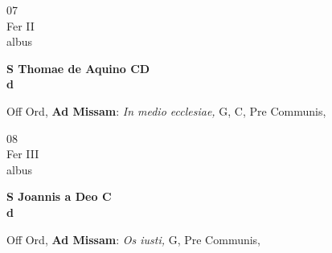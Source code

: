 \documentclass[10pt, openany]{book}
\begin{document}
        \begin{center}
            \begin{minipage}{3.5in}
                \vspace{2em}
                \begin{minipage}{0.5in}
                    {\Huge 07} \\
                    {\normalsize Fer II} \\
                    {\normalsize albus}
                \end{minipage}
                \begin{minipage}{3.0in}
                    \textbf{ \large S Thomae de Aquino CD \\
                    \textnormal{\normalsize d}} \\ 
                \end{minipage}
                \begin{justify}Off Ord, \textbf{Ad Missam}: \textit{In medio ecclesiae,} G, C, Pre Communis,  
                \end{justify}
            \end{minipage}
        \end{center}
    
        \begin{center}
            \begin{minipage}{3.5in}
                \vspace{2em}
                \begin{minipage}{0.5in}
                    {\Huge 08} \\
                    {\normalsize Fer III} \\
                    {\normalsize albus}
                \end{minipage}
                \begin{minipage}{3.0in}
                    \textbf{ \large S Joannis a Deo C \\
                    \textnormal{\normalsize d}} \\ 
                \end{minipage}
                \begin{justify}Off Ord, \textbf{Ad Missam}: \textit{Os iusti,} G, Pre Communis,  
                \end{justify}
            \end{minipage}
        \end{center}
    
\end{document}
